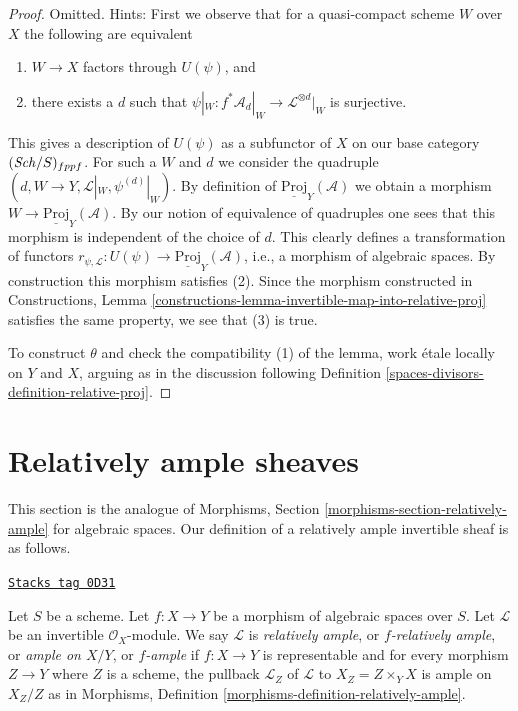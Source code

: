 \begin{proof}
Omitted. Hints:
First we observe that for a quasi-compact scheme
$W$ over $X$ the following are equivalent
\begin{enumerate}
\item $W \to X$ factors through $U(\psi)$, and
\item there exists a $d$ such that
$\psi|_W : f^*\mathcal{A}_d|_W \to \mathcal{L}^{\otimes d}|_W$
is surjective.
\end{enumerate}
This gives a description of $U(\psi)$ as a subfunctor of $X$
on our base category $(\mathit{Sch}/S)_{fppf}$. For such a $W$ and $d$
we consider the quadruple
$(d, W \to Y, \mathcal{L}|_W, \psi^{(d)}|_W)$.
By definition of $\underline{\text{Proj}}_Y(\mathcal{A})$
we obtain a morphism $W \to \underline{\text{Proj}}_Y(\mathcal{A})$.
By our notion of equivalence of quadruples one sees that
this morphism is independent of the choice of $d$.
This clearly defines a transformation of functors
$r_{\psi, \mathcal{L}} : U(\psi) \to \underline{\text{Proj}}_Y(\mathcal{A})$,
i.e., a morphism of algebraic spaces.
By construction this morphism satisfies (2).
Since the morphism constructed in
Constructions, Lemma \ref{constructions-lemma-invertible-map-into-relative-proj}
satisfies the same property, we see that (3) is true.

\medskip\noindent
To construct $\theta$ and check the compatibility (1) of the
lemma, work \'etale locally on $Y$ and $X$, arguing as
in the discussion following
Definition \ref{spaces-divisors-definition-relative-proj}.
\end{proof}

\section{Relatively ample sheaves}
\label{spaces-divisors-section-relatively-ample}
This section is the analogue of
Morphisms, Section \ref{morphisms-section-relatively-ample}
for algebraic spaces.
Our definition of a relatively ample invertible sheaf is as
follows.

\begin{definition}
\label{spaces-divisors-definition-relatively-ample}
\href{https://stacks.math.columbia.edu/tag/0D31}{\texttt{Stacks tag 0D31}}

Let $S$ be a scheme.
Let $f : X \to Y$ be a morphism of algebraic spaces over $S$.
Let $\mathcal{L}$ be an invertible $\mathcal{O}_X$-module.
We say $\mathcal{L}$ is {\it relatively ample}, or {\it $f$-relatively ample},
or {\it ample on $X/Y$}, or {\it $f$-ample} if $f : X \to Y$
is representable and for every morphism $Z \to Y$
where $Z$ is a scheme, the pullback $\mathcal{L}_Z$ of $\mathcal{L}$
to $X_Z = Z \times_Y X$ is ample on $X_Z/Z$ as in
Morphisms, Definition \ref{morphisms-definition-relatively-ample}.
\end{definition}


